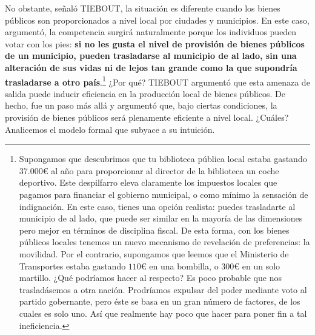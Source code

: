 \documentclass[10pt,a4paper]{article}
\begin{document}
No obstante, señaló TIEBOUT, la situación es diferente cuando los bienes públicos son proporcionados a nivel local por ciudades y municipios. En este caso, argumentó, la competencia surgirá naturalmente porque los individuos pueden votar con los pies: \textbf{si no les gusta el nivel de provisión de bienes públicos de un municipio, pueden trasladarse al municipio de al lado, sin una alteración de sus vidas ni de lejos tan grande como la que supondría trasladarse a otro país}.\footnote{%
    Supongamos que descubrimos que tu biblioteca pública local estaba gastando $37.000€$ al año para proporcionar al director de la biblioteca un coche deportivo. Este despilfarro eleva claramente los impuestos locales que pagamos para financiar el gobierno municipal, o como mínimo la sensación de indignación. En este caso, tienes una opción realista: puedes trasladarte al municipio de al lado, que puede ser similar en la mayoría de las dimensiones pero mejor en términos de disciplina fiscal. De esta forma, con los bienes públicos locales tenemos un nuevo mecanismo de revelación de preferencias: la movilidad. Por el contrario, supongamos que leemos que el Ministerio de Transportes estaba gastando $110€$ en una bombilla, o $300€$ en un solo martillo. ¿Qué podríamos hacer al respecto? Es poco probable que nos trasladásemos a otra nación. Prodríamos expulsar del poder mediante  voto al partido gobernante, pero éste se basa en un gran número de factores, de los cuales es solo uno. Así que realmente hay poco que hacer para poner fin a tal ineficiencia.
} ¿Por qué? TIEBOUT argumentó que esta amenaza de salida puede inducir eficiencia en la producción local de bienes públicos. De hecho, fue un paso más allá y argumentó que, bajo ciertas condiciones, la provisión de bienes públicos será plenamente eficiente a nivel local. ¿Cuáles? Analicemos el modelo formal que subyace a su intuición.
\end{document}
